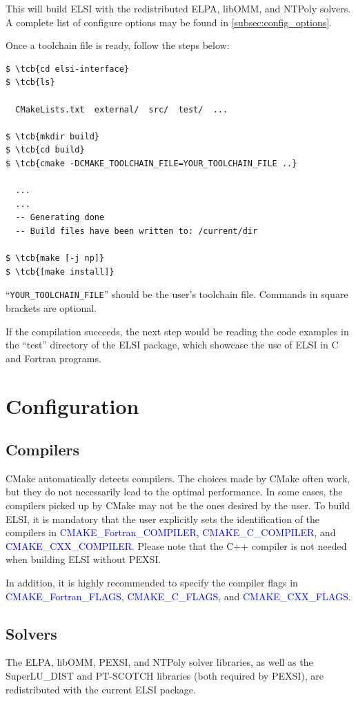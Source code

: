 \documentclass{report}
\newcommand{\tcb}[1]{\textcolor{blue}{#1}}
\begin{document}
This will build ELSI with the redistributed ELPA, libOMM, and NTPoly solvers. A complete list of configure options may be found in \ref{subsec:config_options}.

Once a toolchain file is ready, follow the steps below:
\begin{tcolorbox}
\begin{Verbatim}[commandchars=\\\{\}]
$ \tcb{cd elsi-interface}
$ \tcb{ls}

  CMakeLists.txt  external/  src/  test/  ...

$ \tcb{mkdir build}
$ \tcb{cd build}
$ \tcb{cmake -DCMAKE_TOOLCHAIN_FILE=YOUR_TOOLCHAIN_FILE ..}

  ...
  ...
  -- Generating done
  -- Build files have been written to: /current/dir

$ \tcb{make [-j np]}
$ \tcb{[make install]}
\end{Verbatim}
\end{tcolorbox}

``\verb+YOUR_TOOLCHAIN_FILE+'' should be the user's toolchain file. Commands in square brackets are optional.

If the compilation succeeds, the next step would be reading the code examples in the ``test'' directory of the ELSI package, which showcase the use of ELSI in C and Fortran programs.

\section{Configuration}
\label{sec:config}
\subsection{Compilers}
\label{subsec:config_compilers}
CMake automatically detects compilers. The choices made by CMake often work, but they do not necessarily lead to the optimal performance. In some cases, the compilers picked up by CMake may not be the ones desired by the user. To build ELSI, it is mandatory that the user explicitly sets the identification of the compilers in \tcb{CMAKE\_Fortran\_COMPILER}, \tcb{CMAKE\_C\_COMPILER}, and \tcb{CMAKE\_CXX\_COMPILER}. Please note that the C++ compiler is not needed when building ELSI without PEXSI.

In addition, it is highly recommended to specify the compiler flags in \tcb{CMAKE\_Fortran\_FLAGS}, \tcb{CMAKE\_C\_FLAGS}, and \tcb{CMAKE\_CXX\_FLAGS}.

\subsection{Solvers}
\label{subsec:config_solvers}
The ELPA, libOMM, PEXSI, and NTPoly solver libraries, as well as the SuperLU\_DIST and PT-SCOTCH libraries (both required by PEXSI), are redistributed with the current ELSI package.
\end{document}
